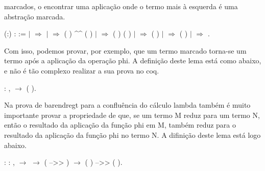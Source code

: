 marcados, o encontrar uma aplicação onde o termo mais à esquerda é uma abstração marcada.\begin{coqdoccode}
\coqdocemptyline
\coqdocnoindent
{}  (:) :  :=\coqdoceol
\coqdocindent{1.00em}
  \coqdoceol
\coqdocindent{1.00em}
\ensuremath{|}    \ensuremath{\Rightarrow}   \coqdoceol
\coqdocindent{11.00em}
\ensuremath{|}   \ensuremath{\Rightarrow} ( ) \^{}\^{} ( )\coqdoceol
\coqdocindent{11.00em}
\ensuremath{|} \coqdocvar{\_} \ensuremath{\Rightarrow}  ( ) ( )\coqdoceol
\coqdocindent{11.00em}
\coqdoceol
\coqdocindent{1.00em}
\ensuremath{|}   \ensuremath{\Rightarrow}  ( )\coqdoceol
\coqdocindent{1.00em}
\ensuremath{|}   \ensuremath{\Rightarrow}  ( )\coqdoceol
\coqdocindent{1.00em}
\ensuremath{|} \coqdocvar{\_} \ensuremath{\Rightarrow} \coqdoceol
\coqdocindent{1.00em}
.\coqdoceol
\coqdocemptyline
\coqdocemptyline
\coqdocemptyline
\end{coqdoccode}
Com isso, podemos provar, por exemplo, que um termo marcado torna-se um termo após a aplicação da operação phi. A definição
deste lema está como abaixo, e não é tão complexo realizar a sua prova no coq.\begin{coqdoccode}
\coqdocemptyline
\coqdocnoindent
{} : \coqdockw{\ensuremath{\forall}} ,   \ensuremath{\rightarrow}  ( ).\coqdoceol
\coqdocemptyline
\coqdocemptyline
\coqdocemptyline
\coqdocemptyline
\coqdocemptyline
\coqdocemptyline
\coqdocemptyline
\coqdocemptyline
\coqdocemptyline
\coqdocemptyline
\coqdocemptyline
\coqdocemptyline
\coqdocemptyline
\end{coqdoccode}
Na prova de barendregt para a confluência do cálculo lambda também é muito importante provar a propriedade de que, se um termo M reduz para um termo N, então o resultado da
 aplicação da função phi em M, também reduz para o resultado da aplicação da função phi no termo N. A difinição deste lema está logo abaixo.\begin{coqdoccode}
\coqdocemptyline
\coqdocnoindent
{} : \coqdockw{\ensuremath{\forall}}   : ,   \ensuremath{\rightarrow}   \ensuremath{\rightarrow} ( -->> ) \ensuremath{\rightarrow} ( ) -->> ( ).\coqdoceol
\coqdocemptyline
\coqdocemptyline
\coqdocemptyline
\coqdocemptyline
\end{coqdoccode}
